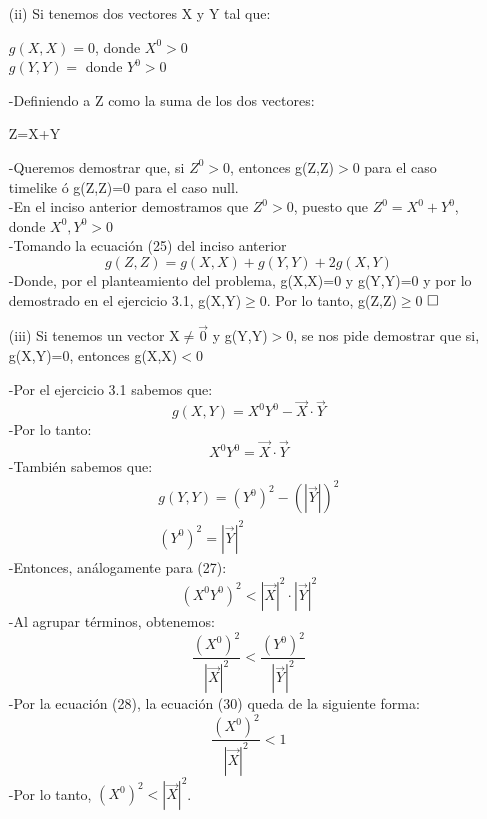 \documentclass[a4paper, 11pt]{article}
\begin{document}
\begin{enumerate}
    \item[(ii)] Si tenemos dos vectores X y Y tal que:
    \begin{center}
    $g(X,X)=0$, donde $X^{0}>0$\\
    $g(Y,Y)=$ donde $Y^{0}>0$
    \end{center}
    -Definiendo a Z como la suma de los dos vectores:
    \begin{center}
        Z=X+Y
    \end{center}
    -Queremos demostrar que, si $Z^{0}>$0, entonces g(Z,Z)$>$0 para el caso timelike ó  g(Z,Z)=0 para el caso null.\\
    -En el inciso anterior demostramos que $Z^{0}>$0, puesto que $Z^{0}=X^{0}+Y^{0}$, donde $X^{0},Y^{0}>$0\\
    -Tomando la ecuación (25) del inciso anterior 
    \begin{equation*}
        g(Z,Z)=g(X,X)+g(Y,Y) +2g(X,Y)
    \end{equation*}
    -Donde, por el planteamiento del problema, g(X,X)=0 y g(Y,Y)=0 y por lo demostrado en el ejercicio 3.1, g(X,Y)$\geq$0. Por lo tanto, g(Z,Z)$\geq$0  
    $\hfill\square$
    \item[(iii)] Si tenemos un vector X$\not = \vec{0}$ y g(Y,Y)$>$0, se nos pide demostrar que si, g(X,Y)=0, entonces g(X,X)$<$0
    
    -Por el ejercicio 3.1 sabemos que:
    \begin{equation}
    g(X,Y)=X^{0}Y^{0} - \vec{X}\cdot\vec{Y}
    \end{equation}
    -Por lo tanto:
    \begin{equation}
    X^{0}Y^{0} = \vec{X}\cdot\vec{Y}
    \end{equation}
    -También sabemos que:
    \begin{eqnarray}
    \nonumber g(Y,Y)=(Y^{0})^2 - (|\vec{Y}|)^2\\
    (Y^{0})^2 = |\vec{Y}|^2
    \end{eqnarray}
    -Entonces, análogamente para (27):
    \begin{equation}
    (X^{0}Y^{0})^2 < |\vec{X}|^2\cdot|\vec{Y}|^2
    \end{equation}
    -Al agrupar términos, obtenemos:
    \begin{equation}
    \frac{(X^{0})^2}{|\vec{X}|^2} < \frac{(Y^{0})^2}{|\vec{Y}|^2}
    \end{equation}
    -Por la ecuación (28), la ecuación (30) queda de la siguiente forma:
    \begin{equation}
    \frac{(X^{0})^2}{|\vec{X}|^2} < 1
    \end{equation}
    -Por lo tanto, $(X^{0})^2<|\vec{X}|^2$.\\
    

\end{enumerate}
\end{document}
